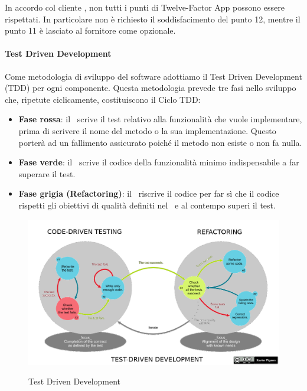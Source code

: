 		In accordo col cliente \II, non tutti i punti di Twelve-Factor App possono essere rispettati. In particolare non è richiesto il soddisfacimento del punto 12, mentre il punto 11 è lasciato al fornitore come opzionale.

		\paragraph{Test Driven Development}\label{tdd}
		Come metodologia di sviluppo del software adottiamo il Test Driven Development (TDD) per ogni componente.
		Questa metodologia prevede tre fasi nello sviluppo che, ripetute ciclicamente, costituiscono il Ciclo TDD:
		\begin{itemize}
			\item \textbf{Fase rossa}: il \Progr\ scrive il test relativo alla funzionalità che vuole implementare, prima di scrivere
				il nome del metodo o la sua implementazione. Questo porterà ad un fallimento assicurato poiché il metodo non esiste o non fa nulla.
			\item \textbf{Fase verde}: il \Progr\ scrive il codice della funzionalità minimo indispensabile a far superare il test.
			\item \textbf{Fase grigia (Refactoring)}: il \Progr\ riscrive il codice per far sì che il codice rispetti
				gli obiettivi di qualità definiti nel \PdQd\ e al contempo superi il test. 
		\end{itemize}

		\begin{figure}[H]
			\centering
			\includegraphics[width=\textwidth]{img/tdd.png}\\
			\caption[Test Driven Development]{Test Driven Development\protect\footnotemark}
		\end{figure}
	
